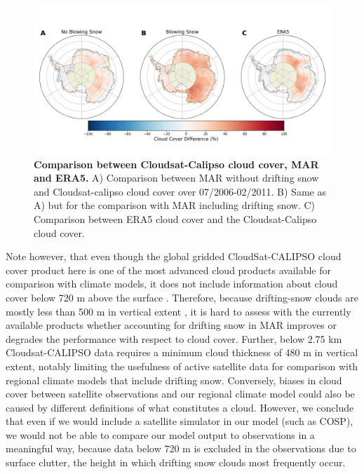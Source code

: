 \documentclass[draft]{agujournal2019}
\begin{document}
\begin{figure}[H]
	\includegraphics[width=1\textwidth]{Calipso_difference_new.png}
	\caption{\textbf{Comparison between Cloudsat-Calipso cloud cover, MAR and ERA5.} A) Comparison between MAR without drifting snow and Cloudsat-calipso cloud cover over 07/2006-02/2011. B) Same as A) but for the comparison with MAR including drifting snow. C) Comparison between ERA5 cloud cover and the Cloudsat-Calipso cloud cover.}
	\label{fig:sat}
\end{figure}


Note however, that even though the global gridded CloudSat-CALIPSO cloud cover product here is one of the most advanced cloud products available for comparison with climate models, it does not include information about cloud cover below 720 m above the surface \cite{kay2009}. Therefore, because drifting-snow clouds are mostly less than 500 m in vertical extent \cite{Palm2018}, it is hard to assess with the currently available products whether accounting for drifting snow in MAR improves or degrades the performance with respect to cloud cover. Further, below 2.75 km Cloudsat-CALIPSO data requires a minimum cloud thickness of 480 m in vertical extent, notably limiting the usefulness of active satellite data for comparison with regional climate models that include drifting snow. Conversely, biases in cloud cover between satellite observations and our regional climate model could also be caused by different definitions of what constitutes a cloud. However, we conclude that even if we would include a satellite simulator in our model (such as COSP), we would not be able to compare our model output to observations in a meaningful way, because data below 720 m is excluded in the observations due to surface clutter, the height in which drifting snow clouds most frequently occur.
\end{document}
